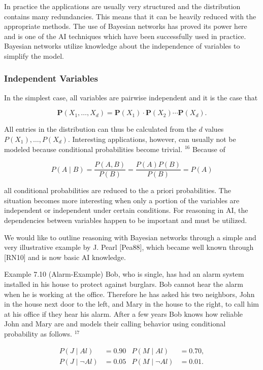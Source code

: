 \documentclass[10pt]{article}
\begin{document}
In practice the applications are usually very structured and the distribution contains many redundancies. This means that it can be heavily reduced with the appropriate methods. The use of Bayesian networks has proved its power here and is one of the AI techniques which have been successfully used in practice. Bayesian networks utilize knowledge about the independence of variables to simplify the model.

\subsubsection*{Independent Variables}
In the simplest case, all variables are pairwise independent and it is the case that

$$
\boldsymbol{P}\left(X_{1}, \ldots, X_{d}\right)=\boldsymbol{P}\left(X_{1}\right) \cdot \boldsymbol{P}\left(X_{2}\right) \cdots \boldsymbol{P}\left(X_{d}\right) .
$$

All entries in the distribution can thus be calculated from the $d$ values $P\left(X_{1}\right), \ldots, P\left(X_{d}\right)$. Interesting applications, however, can usually not be modeled because conditional probabilities become trivial. ${ }^{16}$ Because of

$$
P(A \mid B)=\frac{P(A, B)}{P(B)}=\frac{P(A) P(B)}{P(B)}=P(A)
$$

all conditional probabilities are reduced to the a priori probabilities. The situation becomes more interesting when only a portion of the variables are independent or independent under certain conditions. For reasoning in AI, the dependencies between variables happen to be important and must be utilized.

We would like to outline reasoning with Bayesian networks through a simple and very illustrative example by J. Pearl [Pea88], which became well known through [RN10] and is now basic AI knowledge.

Example 7.10 (Alarm-Example) Bob, who is single, has had an alarm system installed in his house to protect against burglars. Bob cannot hear the alarm when he is working at the office. Therefore he has asked his two neighbors, John in the house next door to the left, and Mary in the house to the right, to call him at his office if they hear his alarm. After a few years Bob knows how reliable John and Mary are and models their calling behavior using conditional probability as follows. ${ }^{17}$

$$
\begin{array}{rlrl}
P(J \mid A l) & =0.90 & P(M \mid A l) & =0.70, \\
P(J \mid \neg A l) & =0.05 & P(M \mid \neg A l) & =0.01 .
\end{array}
$$
\end{document}
